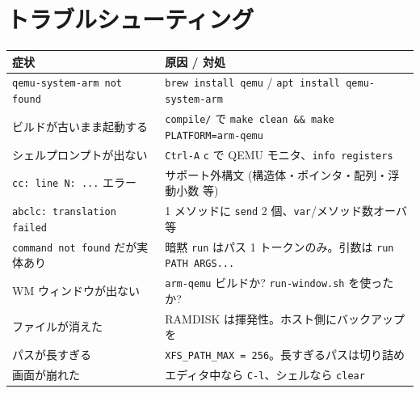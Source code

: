 \documentclass[a4paper,11pt]{ltjsarticle}
\begin{document}
\section{トラブルシューティング}
\begin{center}\footnotesize
\begin{longtable}{@{}p{5.0cm} p{8.4cm}@{}}
\toprule \textbf{症状} & \textbf{原因 / 対処}\\ \midrule \endhead
\verb|qemu-system-arm not found| & \verb|brew install qemu| / \verb|apt install qemu-system-arm|\\
ビルドが古いまま起動する & \verb|compile/| で \verb|make clean && make PLATFORM=arm-qemu|\\
シェルプロンプトが出ない & \verb|Ctrl-A| \textrightarrow{} \verb|c| で QEMU モニタ、\verb|info registers|\\
\verb|cc: line N: ...| エラー & サポート外構文 (構造体・ポインタ・配列・浮動小数 等)\\
\verb|abclc: translation failed| & 1 メソッドに \verb|send| 2 個、\verb|var|/メソッド数オーバ 等\\
\verb|command not found| だが実体あり & 暗黙 \verb|run| はパス 1 トークンのみ。引数は \verb|run PATH ARGS...|\\
WM ウィンドウが出ない & \verb|arm-qemu| ビルドか? \verb|run-window.sh| を使ったか?\\
ファイルが消えた & RAMDISK は揮発性。ホスト側にバックアップを\\
パスが長すぎる & \verb|XFS_PATH_MAX = 256|。長すぎるパスは切り詰め\\
画面が崩れた & エディタ中なら \verb|C-l|、シェルなら \verb|clear|\\
\bottomrule
\end{longtable}
\end{center}

\end{document}
